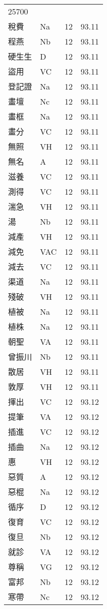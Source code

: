 \documentclass[twocolumn]{book}
\begin{document}
\begin{supertabular}{llrr}
25700\\
稅費 & Na & 12 &  93.11\\
程燕 & Nb & 12 &  93.11\\
硬生生 & D & 12 &  93.11\\
盜用 & VC & 12 &  93.11\\
登記證 & Na & 12 &  93.11\\
畫壇 & Nc & 12 &  93.11\\
畫框 & Na & 12 &  93.11\\
畫分 & VC & 12 &  93.11\\
無照 & VH & 12 &  93.11\\
無名 & A & 12 &  93.11\\
滋養 & VC & 12 &  93.11\\
測得 & VC & 12 &  93.11\\
湍急 & VH & 12 &  93.11\\
湯 & Nb & 12 &  93.11\\
減產 & VH & 12 &  93.11\\
減免 & VAC & 12 &  93.11\\
減去 & VC & 12 &  93.11\\
渠道 & Na & 12 &  93.11\\
殘破 & VH & 12 &  93.11\\
植被 & Na & 12 &  93.11\\
植株 & Na & 12 &  93.11\\
朝聖 & VA & 12 &  93.11\\
曾振川 & Nb & 12 &  93.11\\
散居 & VH & 12 &  93.11\\
敦厚 & VH & 12 &  93.11\\
揮出 & VC & 12 &  93.12\\
提筆 & VA & 12 &  93.12\\
插進 & VC & 12 &  93.12\\
插曲 & Na & 12 &  93.12\\
惠 & VH & 12 &  93.12\\
惡質 & A & 12 &  93.12\\
惡棍 & Na & 12 &  93.12\\
循序 & D & 12 &  93.12\\
復育 & VC & 12 &  93.12\\
復旦 & Nb & 12 &  93.12\\
就診 & VA & 12 &  93.12\\
尊稱 & VG & 12 &  93.12\\
富邦 & Nb & 12 &  93.12\\
寒帶 & Nc & 12 &  93.12\\

\end{supertabular}
\end{document}
